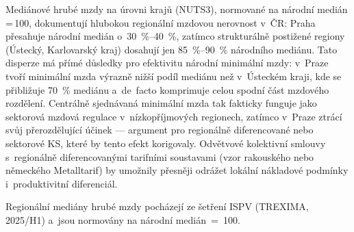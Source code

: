 Mediánové hrubé mzdy na úrovni krajů (NUTS3), normované na národní medián\,=\,100, dokumentují hlubokou regionální mzdovou nerovnost v~ČR: Praha přesahuje národní medián o~\SIrange{30}{40}{\percent}, zatímco strukturálně postižené regiony (Ústecký, Karlovarský kraj) dosahují jen \SIrange{85}{90}{\percent} národního mediánu.
Tato disperze má přímé důsledky pro efektivitu národní minimální mzdy: v~Praze tvoří minimální mzda výrazně nižší podíl mediánu než v~Ústeckém kraji, kde se přibližuje \SI{70}{\percent} mediánu a~de~facto komprimuje celou spodní část mzdového rozdělení.
Centrálně sjednávaná minimální mzda tak fakticky funguje jako sektorová mzdová regulace v~nízkopříjmových regionech, zatímco v~Praze ztrácí svůj přerozdělující účinek --- argument pro regionálně diferencované nebo sektorové \ac{KS}, které by tento efekt korigovaly.
Odvětvové kolektivní smlouvy s~regionálně diferencovanými tarifními soustavami (vzor rakouského nebo německého Metalltarif) by umožnily přesněji odrážet lokální nákladové podmínky i~produktivitní diferenciál.

Regionální mediány hrubé mzdy pocházejí ze šetření \acs{ISPV} (TREXIMA, 2025/H1) a~jsou normovány na národní medián~=~100.\par



